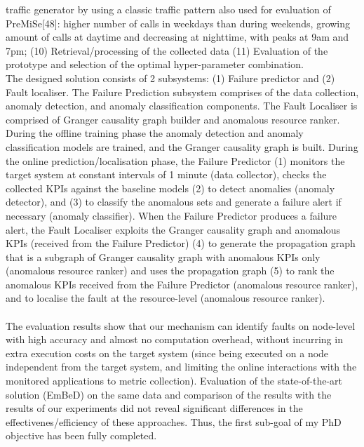 \documentclass[]{usiinfprospectus}
\begin{document}
traffic generator by using a classic traffic pattern also used for evaluation of PreMiSe[48]: higher number of calls in weekdays than during weekends, growing amount of calls at daytime and decreasing at nighttime, with peaks at 9am and 7pm; (10) Retrieval/processing of the collected data (11) Evaluation of the prototype and selection of the optimal hyper-parameter combination.\\
%
The designed solution consists of 2 subsystems: (1) Failure predictor and (2) Fault localiser. The Failure Prediction subsystem comprises of the data collection, anomaly detection, and anomaly classification components. The Fault Localiser is comprised of Granger causality graph builder and anomalous resource ranker.
%
During the offline training phase the anomaly detection and anomaly classification models are trained, and the Granger causality graph is built. During the online prediction/localisation phase, the Failure Predictor (1) monitors the target system at constant intervals of 1 minute (data collector), checks the collected KPIs against the baseline models (2) to detect anomalies (anomaly detector), and (3) to classify the anomalous sets and generate a failure alert if necessary (anomaly classifier). When the Failure Predictor produces a failure alert, the Fault Localiser exploits the Granger causality graph and anomalous KPIs (received from the Failure Predictor) (4) to generate the propagation graph that is a subgraph of Granger causality graph with anomalous KPIs only (anomalous resource ranker) and uses the propagation graph (5) to rank the anomalous KPIs received from the Failure Predictor (anomalous resource ranker), and to localise the fault at the resource-level (anomalous resource ranker).\\\\
%
The evaluation results show that our mechanism can identify faults on node-level with high accuracy and almost no computation overhead, without incurring in extra execution costs on the target system (since being executed on a node independent from the target system, and limiting the online interactions with the monitored applications to metric collection). Evaluation of the state-of-the-art solution (EmBeD) on the same data and comparison of the results with the results of our experiments did not reveal significant differences in the effectivenes/efficiency of these approaches. Thus, the first sub-goal of my PhD objective has been fully completed.
%
%
%
%
\end{document}
